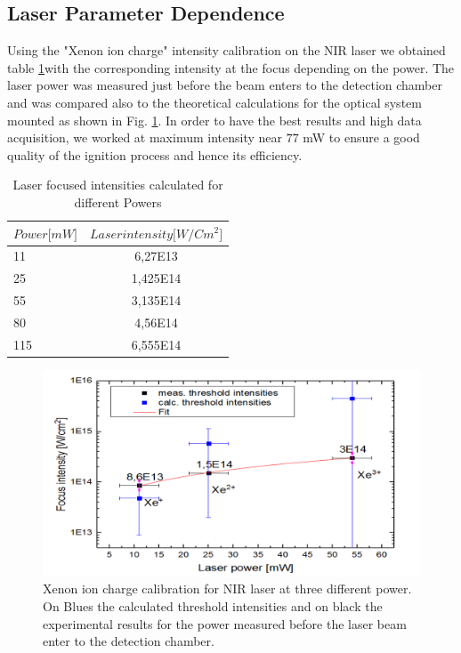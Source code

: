 \subsection{Laser Parameter Dependence}

Using the "Xenon ion charge" intensity calibration on the NIR laser we obtained table \ref{tab:nirintens}with the corresponding intensity at the focus depending on the power. The laser power was measured just before the beam enters to the detection chamber and was compared also to the theoretical calculations for the optical system mounted as shown in Fig. \ref{fig:xeionchargecalib}. In order to have the best results and high data acquisition, we worked at maximum intensity near $77$ mW to ensure a good quality of the ignition process and hence its efficiency.

\begin{table}[t]

\centering
\begin{tabular}{|l|c|}
\hline
\multicolumn{1}{|c|}{$Power{[}mW{]}$} & $Laser intensity {[}W/Cm^{2}{]}$ \\ \hline
11                                  & 6,27E13                                           \\ \hline
25                                  & 1,425E14                                          \\ \hline
55                                  & 3,135E14                                          \\ \hline
80                                  & 4,56E14                                           \\ \hline
115                                 & 6,555E14                                          \\ \hline
\end{tabular}
\caption[NIR laser power to intensities]{Laser focused intensities calculated for different Powers }
\label{tab:nirintens}
\end{table}


\begin{figure}[h!]
\centering
\includegraphics[width=10 cm]{../Images/Xeioncharges_intensitycalib.png} 
\caption[Xenon ion charge calibration for NIR] {Xenon ion charge calibration for NIR laser at three different power. On Blues the calculated threshold intensities and on black the experimental results for the power measured before the laser beam enter to the detection chamber.}
\label{fig:xeionchargecalib}
\end{figure}

